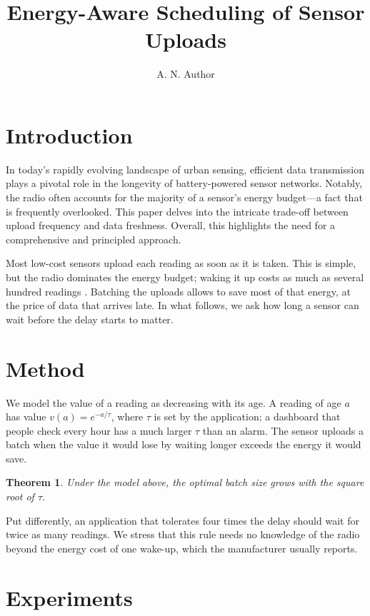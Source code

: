 \documentclass{article}
\title{Energy-Aware Scheduling of Sensor Uploads}
\author{A. N. Author}
\date{}
\newtheorem{thm}{Theorem}
\begin{document}
\maketitle

\section{Introduction}

In today's rapidly evolving landscape of urban sensing, efficient data
transmission plays a pivotal role in the longevity of battery-powered sensor
networks. Notably, the radio often accounts for the majority of a sensor's
energy budget---a fact that is frequently overlooked. This paper delves into
the intricate trade-off between upload frequency and data freshness.
Overall, this highlights the need for a comprehensive and principled
approach.

Most low-cost sensors upload each reading as soon as it is taken. This is
simple, but the radio dominates the energy budget; waking it up costs as
much as several hundred readings \citep{anastasi2009energy}. Batching the
uploads allows to save most of that energy, at the price of data that
arrives late. In what follows, we ask how long a sensor can wait before the
delay starts to matter.

\section{Method}

We model the value of a reading as decreasing with its age. A reading of age
$a$ has value $v(a) = e^{-a / \tau}$, where $\tau$ is set by the
application; a dashboard that people check every hour has a much larger
$\tau$ than an alarm. The sensor uploads a batch when the value it would
lose by waiting longer exceeds the energy it would save.

\begin{thm}\label{thm:batch}
  Under the model above, the optimal batch size grows with the square root of $\tau$.
\end{thm}

Put differently, an application that tolerates four times the delay should
wait for twice as many readings. We stress that this rule needs no knowledge
of the radio beyond the energy cost of one wake-up, which the manufacturer
usually reports.

\section{Experiments}
\end{document}
